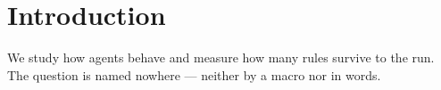 \section{Introduction}
We study how agents behave and measure how many rules survive to the run.
The question is named nowhere — neither by a macro nor in words.
